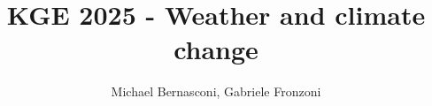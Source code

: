 \documentclass{knowdive}
\title{KGE 2025 - Weather and climate change}
\author{Michael Bernasconi, Gabriele Fronzoni}
\begin{document}
\maketitle
\begin{sloppypar}
\large
\begin{spacing}{1.05}


\newpage

\newpage

\newpage

\newpage

\newpage

\newpage

\newpage

\newpage


\end{spacing}
\end{sloppypar}
\end{document}
